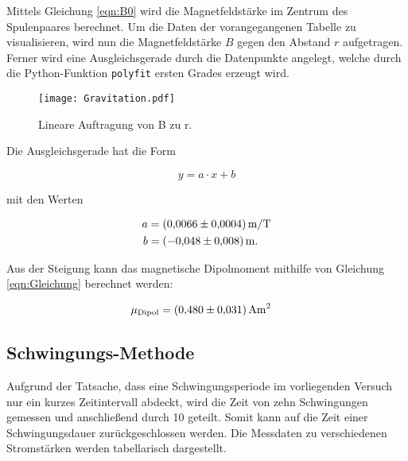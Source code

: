 \noindent Mittels Gleichung \eqref{eqn:B0} wird die Magnetfeldstärke im Zentrum des Spulenpaares berechnet. Um die Daten 
der vorangegangenen Tabelle zu visualisieren, wird nun die Magnetfeldstärke $B$ gegen den Abstand $r$ aufgetragen. Ferner
wird eine Ausgleichsgerade durch die Datenpunkte angelegt, welche durch die Python-Funktion \texttt{polyfit} ersten Grades
erzeugt wird.

\begin{figure}[H]
    \texttt{[image: Gravitation.pdf]}
    \caption{Lineare Auftragung von B zu r.}  
\end{figure}

\noindent Die Ausgleichsgerade hat die Form 

\begin{equation*}
    y = a\cdot x + b
\end{equation*}

\noindent mit den Werten

\begin{align*}
    a &= \qty{0.0066 \pm 0.0004}{\unit{\meter \per \tesla}} \\
    b &= \qty{-0.048 \pm 0.008}{\unit{\meter}}.
\end{align*}

\noindent Aus der Steigung kann das magnetische Dipolmoment mithilfe von Gleichung \eqref{eqn:Gleichung} 
berechnet werden:

\begin{align*}
    \mu_\text{Dipol} &= \qty{0.480 \pm 0.031}{\unit{\ampere \meter \squared}} 
\end{align*}


\subsection{Schwingungs-Methode}

Aufgrund der Tatsache, dass eine Schwingungsperiode im vorliegenden Versuch nur ein kurzes Zeitintervall abdeckt, 
wird die Zeit von zehn Schwingungen gemessen und anschließend durch 10 geteilt. 
Somit kann auf die Zeit einer Schwingungsdauer zurückgeschlossen werden. Die Messdaten zu verschiedenen Stromstärken 
werden tabellarisch dargestellt. 

